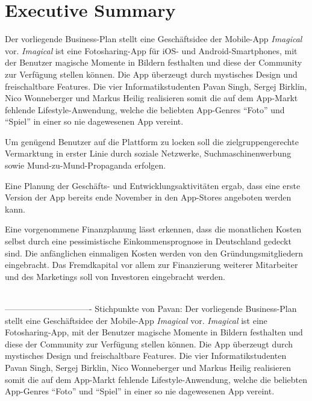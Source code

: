 \chapter{Executive Summary}

Der vorliegende Business-Plan stellt eine Geschäftsidee der Mobile-App \textit{Imagical} vor.
\textit{Imagical} ist eine Fotosharing-App für iOS- und Android-Smartphones, mit der Benutzer magische Momente in Bildern festhalten und diese der Community zur Verfügung stellen können. 
Die App überzeugt durch mystisches Design und freischaltbare Features.
Die vier Informatikstudenten Pavan Singh, Sergej Birklin, Nico Wonneberger und Markus Heilig realisieren somit die auf dem App-Markt fehlende Lifestyle-Anwendung, welche die beliebten App-Genres ``Foto'' und ``Spiel'' in einer so nie dagewesenen App vereint.

Um genügend Benutzer auf die Plattform zu locken soll die zielgruppengerechte Vermarktung in erster Linie durch soziale Netzwerke, Suchmaschinenwerbung sowie Mund-zu-Mund-Propaganda erfolgen. 

Eine Planung der Geschäfts- und Entwicklungsaktivitäten ergab, dass eine erste Version der App bereits ende November in den App-Stores angeboten werden kann.

Eine vorgenommene Finanzplanung lässt erkennen, dass die monatlichen Kosten selbst durch eine pessimistische Einkommensprognose in Deutschland gedeckt sind. Die anfänglichen einmaligen Kosten werden von den Gründungsmitgliedern eingebracht. Das Fremdkapital vor allem zur Finanzierung weiterer Mitarbeiter und des Marketings soll von Investoren eingebracht werden.

\mbox{} \\ -------------------------------
Stichpunkte von Pavan:
Der vorliegende Business-Plan stellt eine Geschäftsidee der Mobile-App \textit{Imagical} vor.
\textit{Imagical} ist eine Fotosharing-App, mit der Benutzer magische Momente in Bildern festhalten und diese der Community zur Verfügung stellen können. 
Die App überzeugt durch mystisches Design und freischaltbare Features.
Die vier Informatikstudenten Pavan Singh, Sergej Birklin, Nico Wonneberger und Markus Heilig realisieren somit die auf dem App-Markt fehlende Lifestyle-Anwendung, welche die beliebten App-Genres ``Foto'' und ``Spiel'' in einer so nie dagewesenen App vereint.

